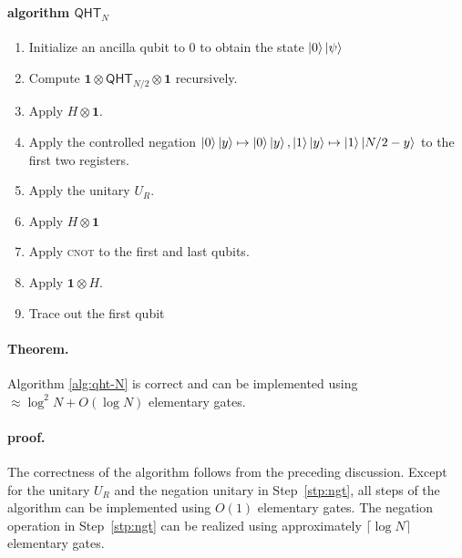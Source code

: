 \documentclass[12pt]{report}
\newcommand{\qht}{\mathsf{QHT}}
\begin{document}
\paragraph{algorithm $\qht_N$}

\begin{enumerate}%
    \item Initialize an ancilla qubit to $0$ to obtain the state $\ket{0}\ket{\psi}$
    \item Compute $\mathbf{1} \otimes \qht_{N / 2} \otimes \mathbf{1}$ recursively.
    \item Apply $H \otimes \mathbf{1}$.
    \item\label{stp:ngt} Apply the controlled negation $\ket{0}\ket{y} \mapsto \ket{0}\ket{y}, \ket{1}\ket{y} \mapsto \ket{1}\ket{N / 2 -y}$ to the first two registers.
    \item Apply the unitary $U_R$.
    \item Apply $H \otimes \mathbf{1}$
    \item Apply \textsc{cnot} to the first and last qubits.
    \item Apply $\mathbf{1} \otimes H$.
    \item Trace out the first qubit
\end{enumerate}


\paragraph{Theorem.}
    \label{thm:qht-cost}
    Algorithm \ref{alg:qht-N} is correct and can be implemented using $\approx \log^2 N + O(\log N)$ elementary gates.


\paragraph{proof.}
    The correctness of the algorithm follows from the preceding discussion. Except for the unitary \( U_R \) and the negation unitary in Step~\ref{stp:ngt}, all steps of the algorithm can be implemented using \( O(1) \) elementary gates. The negation operation in Step~\ref{stp:ngt} can be realized using approximately \( \lceil \log N \rceil \) elementary gates.
    
\end{document}
